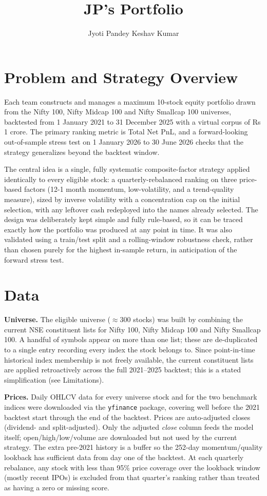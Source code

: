 \documentclass[11pt]{article}
\title{\vspace{-1.5em}\textbf{JP's Portfolio}}
\author{Jyoti Pandey \quad Keshav Kumar}
\date{}
\begin{document}
\maketitle
\vspace{-3em}

\section{Problem and Strategy Overview}

Each team constructs and manages a maximum 10-stock equity portfolio drawn from the Nifty 100, Nifty Midcap 100 and Nifty Smallcap 100 universes, backtested from 1 January 2021 to 31 December 2025 with a virtual corpus of Rs 1 crore. The primary ranking metric is Total Net PnL, and a forward-looking out-of-sample stress test on 1 January 2026 to 30 June 2026 checks that the strategy generalizes beyond the backtest window.

The central idea is a single, fully systematic composite-factor strategy applied identically to every eligible stock: a quarterly-rebalanced ranking on three price-based factors (12-1 month momentum, low-volatility, and a trend-quality measure), sized by inverse volatility with a concentration cap on the initial selection, with any leftover cash redeployed into the names already selected. The design was deliberately kept simple and fully rule-based, so it can be traced exactly how the portfolio was produced at any point in time. It was also validated using a train/test split and a rolling-window robustness check, rather than chosen purely for the highest in-sample return, in anticipation of the forward stress test.

\section{Data}

\textbf{Universe.} The eligible universe ($\approx$300 stocks) was built by combining the current NSE constituent lists for Nifty 100, Nifty Midcap 100 and Nifty Smallcap 100. A handful of symbols appear on more than one list; these are de-duplicated to a single entry recording every index the stock belongs to. Since point-in-time historical index membership is not freely available, the current constituent lists are applied retroactively across the full 2021--2025 backtest; this is a stated simplification (see Limitations).

\textbf{Prices.} Daily OHLCV data for every universe stock and for the two benchmark indices were downloaded via the \texttt{yfinance} package, covering well before the 2021 backtest start through the end of the backtest. Prices are auto-adjusted closes (dividend- and split-adjusted). Only the adjusted \emph{close} column feeds the model itself; open/high/low/volume are downloaded but not used by the current strategy. The extra pre-2021 history is a buffer so the 252-day momentum/quality lookback has sufficient data from day one of the backtest. At each quarterly rebalance, any stock with less than 95\% price coverage over the lookback window (mostly recent IPOs) is excluded from that quarter's ranking rather than treated as having a zero or missing score.
\end{document}
